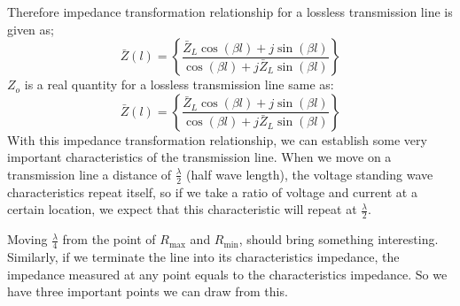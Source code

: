 Therefore impedance transformation relationship for a lossless transmission line is given as;
\begin{equation}
\bar{Z}(l) = \left\lbrace \frac{\bar{Z}_L\cos(\beta l) + j\sin(\beta l)}{\cos(\beta l) + j\bar{Z}_L\sin(\beta l)}\right\rbrace
\label{eqn:charimp}
\end{equation}
$Z_o$ is a real quantity for a lossless transmission line same as:
\begin{equation}
\bar{Z}(l) = \left\lbrace \frac{\bar{Z}_L\cos(\beta l) + j\sin(\beta l)}{\cos(\beta l) + j\bar{Z}_L\sin(\beta l)}\right\rbrace
\label{eqn:charimpnorm}
\end{equation}
With this impedance transformation relationship, we can establish some very important characteristics of the transmission line. When we move on a transmission line a distance of $\frac{\lambda}{2}$ (half wave length), the voltage standing wave characteristics repeat itself, so if we take a ratio of voltage and current at a certain location, we expect that this characteristic will repeat at $\frac{\lambda}{2}$.

Moving $\frac{\lambda}{4}$ from the point of $R_{\max}$ and $R_{\min}$, should bring something interesting. Similarly, if we terminate the line into its characteristics impedance, the impedance measured at any point equals to the characteristics impedance. So we have three important points we can draw from this.

